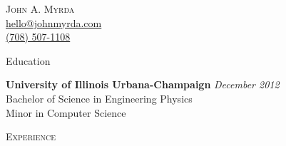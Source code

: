 \documentclass{article}
\newenvironment{changemargin}[2]{%
  \begin{list}{}{%
    \setlength{\topsep}{0pt}%
    \setlength{\leftmargin}{#1}%
    \setlength{\rightmargin}{#2}%
    \setlength{\listparindent}{\parindent}%
    \setlength{\itemindent}{\parindent}%
    \setlength{\parsep}{\parskip}%
  }%
  \item[]}{\end{list}
}
\newcommand{\lineover}{
	\begin{changemargin}{-0.05in}{-0.05in}
		\vspace*{-8pt}
		\hrulefill \\
		\vspace*{-2pt}
	\end{changemargin}
}
\newcommand{\header}[1]{
	\begin{changemargin}{-0.5in}{-0.5in}
		\scshape{#1}\\
  	\lineover
	\end{changemargin}
}
\newcommand{\contact}[4]{
	\begin{changemargin}{-0.5in}{-0.5in}
		\begin{center}
			{\Large \scshape {#1}}\\ \smallskip
			{#2}\\ \smallskip 
			{#3}\\ \smallskip
			{#4}\smallskip
		\end{center}
	\end{changemargin}
}
\newenvironment{body} {
	\vspace*{-16pt}
	\begin{changemargin}{-0.25in}{-0.5in}
  }	
	{\end{changemargin}
}
\begin{document}
\contact{John A. Myrda}
{\href{mailto:hello@johnmyrda.com}{hello@johnmyrda.com}}
{\href{tel:7085071108}{(708) 507-1108}}




\header{Education}
	\vspace{14pt}
\begin{body}

	\textbf{University of Illinois Urbana-Champaign} \hfill \emph{December 2012}{} \\
	\hspace{4ex} Bachelor of Science in Engineering Physics \\
	\hspace{4ex} Minor in Computer Science\\
\end{body}


\header{Experience}
\end{document}
